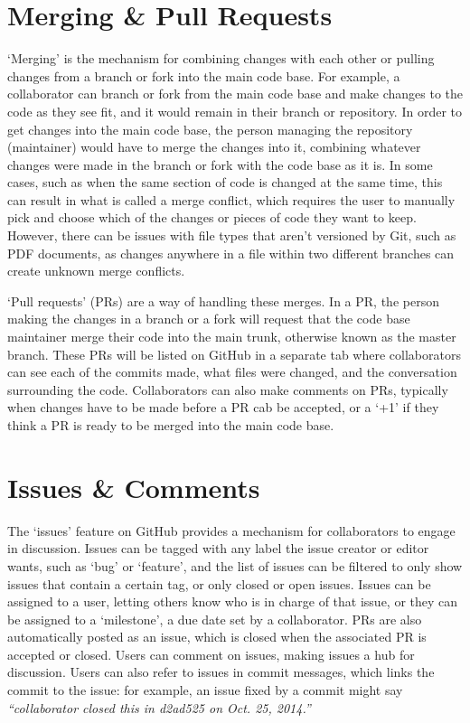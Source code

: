 \section{Merging \& Pull Requests}
`Merging' is the mechanism for combining changes with each other or pulling changes from a branch or fork into the main code base. For example, a collaborator can branch or fork from the main code base and make changes to the code as they see fit, and it would remain in their branch or repository. In order to get changes into the main code base, the person managing the repository (maintainer) would have to merge the changes into it, combining whatever changes were made in the branch or fork with the code base as it is. In some cases, such as when the same section of code is changed at the same time, this can result in what is called a merge conflict, which requires the user to manually pick and choose which of the changes or pieces of code they want to keep. However, there can be issues with file types that aren't versioned by Git, such as PDF documents, as changes anywhere in a file within two different branches can create unknown merge conflicts.

`Pull requests' (PRs) are a way of handling these merges. In a PR, the person making the changes in a branch or a fork will request that the code base maintainer merge their code into the main trunk, otherwise known as the master branch. These PRs will be listed on GitHub in a separate tab where collaborators can see each of the commits made, what files were changed, and the conversation surrounding the code. Collaborators can also make comments on PRs, typically when changes have to be made before a PR cab be accepted, or a `+1' if they think a PR is ready to be merged into the main code base.

\section{Issues \& Comments}
The `issues' feature on GitHub provides a mechanism for collaborators to engage in discussion. Issues can be tagged with any label the issue creator or editor wants, such as `bug' or `feature', and the list of issues can be filtered to only show issues that contain a certain tag, or only closed or open issues. Issues can be assigned to a user, letting others know who is in charge of that issue, or they can be assigned to a `milestone', a due date set by a collaborator. PRs are also automatically posted as an issue, which is closed when the associated PR is accepted or closed. Users can comment on issues, making issues a hub for discussion. Users can also refer to issues in commit messages, which links the commit to the issue: for example, an issue fixed by a commit might say \textit{``collaborator closed this in d2ad525 on Oct. 25, 2014.''}

